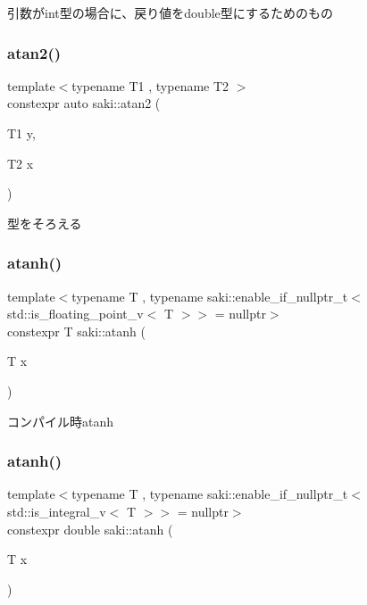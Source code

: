 引数がint型の場合に、戻り値をdouble型にするためのもの 

\mbox{\label{namespacesaki_a5c656a9f2a0c0cfe522fb95ac37128cc}} 
\subsubsection{\texorpdfstring{atan2()}{atan2()}\hspace{0.1cm}{\footnotesize\ttfamily [3/3]}}
{\footnotesize\ttfamily template$<$typename T1 , typename T2 $>$ \\
constexpr auto saki\+::atan2 (\begin{DoxyParamCaption}\item[{T1}]{y,  }\item[{T2}]{x }\end{DoxyParamCaption})}



型をそろえる 

\mbox{\label{namespacesaki_adbfceeab527c51676d00fae31e077dcf}} 
\subsubsection{\texorpdfstring{atanh()}{atanh()}\hspace{0.1cm}{\footnotesize\ttfamily [1/2]}}
{\footnotesize\ttfamily template$<$typename T , typename saki\+::enable\+\_\+if\+\_\+nullptr\+\_\+t$<$ std\+::is\+\_\+floating\+\_\+point\+\_\+v$<$ T $>$$>$  = nullptr$>$ \\
constexpr T saki\+::atanh (\begin{DoxyParamCaption}\item[{T}]{x }\end{DoxyParamCaption})}



コンパイル時atanh 

\mbox{\label{namespacesaki_a1b7d87f99b61600e1201b10de467200f}} 
\subsubsection{\texorpdfstring{atanh()}{atanh()}\hspace{0.1cm}{\footnotesize\ttfamily [2/2]}}
{\footnotesize\ttfamily template$<$typename T , typename saki\+::enable\+\_\+if\+\_\+nullptr\+\_\+t$<$ std\+::is\+\_\+integral\+\_\+v$<$ T $>$$>$  = nullptr$>$ \\
constexpr double saki\+::atanh (\begin{DoxyParamCaption}\item[{T}]{x }\end{DoxyParamCaption})}



